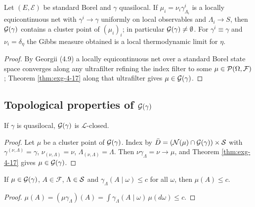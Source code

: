 \begin{theorem}[Georgii (4.22)]
    \label{thm:exg-4-22}
    \leanok

    Let $(E,\mathcal E)$ be standard Borel and $\gamma$ quasilocal. If
    $\mu_i=\nu_i\gamma^i_{\Lambda_i}$ is a locally equicontinuous net with
    $\gamma^i\to\gamma$ uniformly on local observables and $\Lambda_i\to S$, then
    $\mathcal{G}(\gamma)$ contains a cluster point of $(\mu_i)_i$; in particular
    $\mathcal{G}(\gamma)\neq\emptyset$. For $\gamma^i\equiv\gamma$ and $\nu_i=\delta_\eta$ the Gibbs
    measure obtained is a local thermodynamic limit for $\eta$.
\end{theorem}
\begin{proof}
    \leanok

    By Georgii (4.9) a locally equicontinuous net over a standard Borel state space converges
    along any ultrafilter refining the index filter to some $\mu\in\mathcal{P}(\Omega,\mathcal F)$;
    Theorem \ref{thm:exg-4-17} along that ultrafilter gives $\mu\in\mathcal{G}(\gamma)$.
\end{proof}

\subsection*{Topological properties of $\mathcal{G}(\gamma)$}

\begin{lemma}
    \label{lem:exg-gp-closed}
    \leanok

    If $\gamma$ is quasilocal, $\mathcal{G}(\gamma)$ is $\mathcal L$-closed.
\end{lemma}
\begin{proof}
    \leanok

    Let $\mu$ be a cluster point of $\mathcal{G}(\gamma)$. Index by
    $\bar D = (\mathcal N(\mu)\cap\mathcal{G}(\gamma))\times\mathcal{S}$ with
    $\gamma^{(\nu,\Lambda)}=\gamma$, $\nu_{(\nu,\Lambda)}=\nu$,
    $\Lambda_{(\nu,\Lambda)}=\Lambda$. Then $\nu\gamma_\Lambda=\nu\to\mu$, and
    Theorem \ref{thm:exg-4-17} gives $\mu\in\mathcal{G}(\gamma)$.
\end{proof}

\begin{lemma}
    \label{lem:exg-gp-dominated}
    \leanok

    If $\mu\in\mathcal{G}(\gamma)$, $A\in\mathcal F$, $\Lambda\in\mathcal{S}$ and
    $\gamma_\Lambda(A\mid\omega)\le c$ for all $\omega$, then $\mu(A)\le c$.
\end{lemma}
\begin{proof}
    \leanok

    $\mu(A)=(\mu\gamma_\Lambda)(A)=\int\gamma_\Lambda(A\mid\omega)\,\mu(d\omega)\le c$.
\end{proof}

